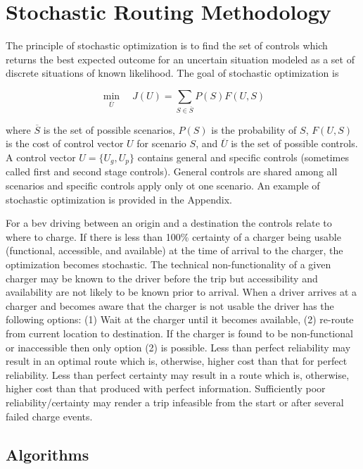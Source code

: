 \section{Stochastic Routing Methodology}

The principle of stochastic optimization is to find the set of controls which returns the best expected outcome for an uncertain situation modeled as a set of discrete situations of known likelihood. The goal of stochastic optimization is

\begin{equation}
	\min_{\overline{U}}\quad J(U)=\sum_{S\in\overline{S}} P(S)F(U,S)\label{eq:stochastic_optimization}
\end{equation}

where $\overline{S}$ is the set of possible scenarios, $P(S)$ is the probability of $S$, $F(U,S)$ is the cost of control vector $U$ for scenario $S$, and $\overline{U}$ is the set of possible controls. A control vector $U=\{U_g,U_p\}$ contains general and specific controls (sometimes called first and second stage controls). General controls are shared among all scenarios and specific controls apply only ot one scenario. An example of stochastic optimization is provided in the Appendix.

For a \gls{bev} driving between an origin and a destination the controls relate to where to charge. If there is less than 100\% certainty of a charger being usable (functional, accessible, and available) at the time of arrival to the charger, the optimization becomes stochastic. The technical non-functionality of a given charger may be known to the driver before the trip but accessibility and availability are not likely to be known prior to arrival. When a driver arrives at a charger and becomes aware that the charger is not usable the driver has the following options: (1) Wait at the charger until it becomes available, (2) re-route from current location to destination. If the charger is found to be non-functional or inaccessible then only option (2) is possible. Less than perfect reliability may result in an optimal route which is, otherwise, higher cost than that for perfect reliability. Less than perfect certainty may result in a route which is, otherwise, higher cost than that produced with perfect information. Sufficiently poor reliability/certainty may render a trip infeasible from the start or after several failed charge events.

\subsection{Algorithms}

